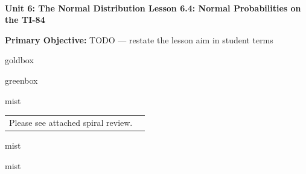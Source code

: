 \documentclass[10pt]{article}
\newcommand{\UnitNumberName}{Unit 6: The Normal Distribution \quad}
\newcommand{\LessonNumberName}{Lesson 6.4: Normal Probabilities on the TI-84}
\begin{document}
\begin{center}
    {\Large\bfseries \CourseName \\
    {\small\bfseries \UnitNumberName \LessonNumberName}}
\end{center}

\begin{tcolorbox}[colback=mist, colframe=royal, boxrule=0.9pt, arc=2mm,
    left=2mm, right=2mm, top=1.5mm, bottom=1.5mm]
    \textbf{Primary Objective:} TODO --- restate the lesson aim in student terms
\end{tcolorbox}

\renewcommand{\arraystretch}{1.6}
\begin{skillbox}{goldbox}
\end{skillbox}

\begin{skillbox}{greenbox}
\end{skillbox}

\begin{fixedskillbox}{mist}
    \begin{tabularx}{\linewidth}{@{}X c@{}}
        \begin{minipage}[t]{0.55\linewidth}\vspace{0pt}
            Please see attached spiral review.  %
        \end{minipage}
        &
        \begin{minipage}[t]{0.38\linewidth}\vspace{0pt}\centering
        \end{minipage}
    \end{tabularx}
\end{fixedskillbox}

\begin{skillbox}[Hook]{mist}
\end{skillbox}

\begin{skillbox}[Lesson]{mist}
\end{skillbox}
\end{document}
